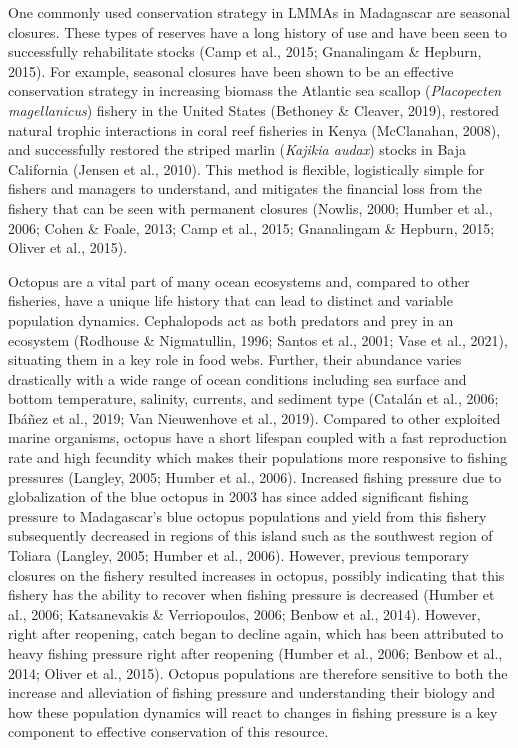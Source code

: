 \documentclass[
]{article}
\begin{document}
One commonly used conservation strategy in LMMAs in Madagascar are seasonal closures. These types of reserves have a long history of use and have been seen to successfully rehabilitate stocks (Camp et al., 2015; Gnanalingam \& Hepburn, 2015). For example, seasonal closures have been shown to be an effective conservation strategy in increasing biomass the Atlantic sea scallop (\emph{Placopecten magellanicus}) fishery in the United States (Bethoney \& Cleaver, 2019), restored natural trophic interactions in coral reef fisheries in Kenya (McClanahan, 2008), and successfully restored the striped marlin (\emph{Kajikia audax}) stocks in Baja California (Jensen et al., 2010). This method is flexible, logistically simple for fishers and managers to understand, and mitigates the financial loss from the fishery that can be seen with permanent closures (Nowlis, 2000; Humber et al., 2006; Cohen \& Foale, 2013; Camp et al., 2015; Gnanalingam \& Hepburn, 2015; Oliver et al., 2015).

Octopus are a vital part of many ocean ecosystems and, compared to other fisheries, have a unique life history that can lead to distinct and variable population dynamics. Cephalopods act as both predators and prey in an ecosystem (Rodhouse \& Nigmatullin, 1996; Santos et al., 2001; Vase et al., 2021), situating them in a key role in food webs. Further, their abundance varies drastically with a wide range of ocean conditions including sea surface and bottom temperature, salinity, currents, and sediment type (Catalán et al., 2006; Ibáñez et al., 2019; Van Nieuwenhove et al., 2019). Compared to other exploited marine organisms, octopus have a short lifespan coupled with a fast reproduction rate and high fecundity which makes their populations more responsive to fishing pressures (Langley, 2005; Humber et al., 2006). Increased fishing pressure due to globalization of the blue octopus in 2003 has since added significant fishing pressure to Madagascar's blue octopus populations and yield from this fishery subsequently decreased in regions of this island such as the southwest region of Toliara (Langley, 2005; Humber et al., 2006). However, previous temporary closures on the fishery resulted increases in octopus, possibly indicating that this fishery has the ability to recover when fishing pressure is decreased (Humber et al., 2006; Katsanevakis \& Verriopoulos, 2006; Benbow et al., 2014). However, right after reopening, catch began to decline again, which has been attributed to heavy fishing pressure right after reopening (Humber et al., 2006; Benbow et al., 2014; Oliver et al., 2015).
Octopus populations are therefore sensitive to both the increase and alleviation of fishing pressure and understanding their biology and how these population dynamics will react to changes in fishing pressure is a key component to effective conservation of this resource.
\end{document}
